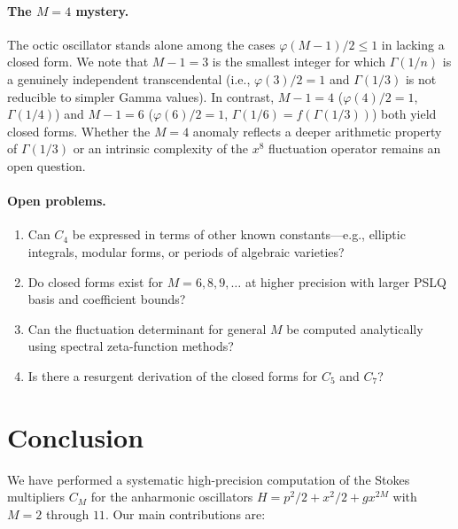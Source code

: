 \documentclass[12pt,a4paper]{article}
\numberwithin{equation}{section}
\theoremstyle{plain}
\theoremstyle{definition}
\theoremstyle{remark}
\begin{document}
\paragraph{The $M = 4$ mystery.}
The octic oscillator stands alone among the cases $\varphi(M{-}1)/2 \le 1$
in lacking a closed form. We note that $M{-}1 = 3$ is the smallest
integer for which $\Gamma(1/n)$ is a genuinely independent
transcendental (i.e., $\varphi(3)/2 = 1$ and $\Gamma(1/3)$ is not
reducible to simpler Gamma values). In contrast, $M{-}1 = 4$
($\varphi(4)/2 = 1$, $\Gamma(1/4)$) and $M{-}1 = 6$
($\varphi(6)/2 = 1$, $\Gamma(1/6) = f(\Gamma(1/3))$) both yield closed
forms. Whether the $M = 4$ anomaly reflects a deeper arithmetic property
of $\Gamma(1/3)$ or an intrinsic complexity of the $x^8$ fluctuation
operator remains an open question.

\paragraph{Open problems.}
\begin{enumerate}[leftmargin=*]
\item Can $C_4$ be expressed in terms of other known constants---e.g.,
  elliptic integrals, modular forms, or periods of algebraic varieties?
\item Do closed forms exist for $M = 6, 8, 9, \ldots$ at higher precision
  with larger PSLQ basis and coefficient bounds?
\item Can the fluctuation determinant for general $M$ be computed analytically
  using spectral zeta-function methods?
\item Is there a resurgent derivation of the closed forms for $C_5$ and $C_7$?
\end{enumerate}

\section{Conclusion}
\label{sec:conclusion}

We have performed a systematic high-precision computation of the Stokes
multipliers $C_M$ for the anharmonic oscillators $H = p^2/2 + x^2/2 + gx^{2M}$
with $M = 2$ through $11$. Our main contributions are:
\end{document}
